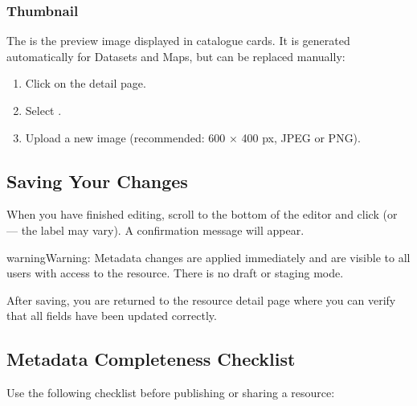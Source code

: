 \documentclass[letterpaper,10pt,english]{sphinxmanual}
\begin{document}
\subsubsection{Thumbnail}
\label{\detokenize{en/03_managing_metadata:thumbnail}}
\sphinxAtStartPar
The  is the preview image displayed in catalogue cards. It is generated
automatically for Datasets and Maps, but can be replaced manually:
\begin{enumerate}
%
\item {} 
\sphinxAtStartPar
Click  on the detail page.

\item {} 
\sphinxAtStartPar
Select .

\item {} 
\sphinxAtStartPar
Upload a new image (recommended: 600 × 400 px, JPEG or PNG).

\end{enumerate}


\subsection{Saving Your Changes}
\label{\detokenize{en/03_managing_metadata:saving-your-changes}}
\sphinxAtStartPar
When you have finished editing, scroll to the bottom of the editor and click
 (or  — the label may vary). A confirmation message will appear.

\begin{sphinxadmonition}{warning}{Warning:}
\sphinxAtStartPar
Metadata changes are applied immediately and are visible to all users with access to
the resource. There is no draft or staging mode.
\end{sphinxadmonition}

\sphinxAtStartPar
After saving, you are returned to the resource detail page where you can verify that
all fields have been updated correctly.


\subsection{Metadata Completeness Checklist}
\label{\detokenize{en/03_managing_metadata:metadata-completeness-checklist}}
\sphinxAtStartPar
Use the following checklist before publishing or sharing a resource:
\end{document}
